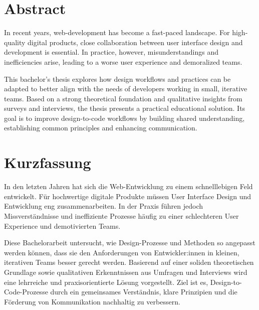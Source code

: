 \newpage
\section*{Abstract}
In recent years, web-development has become a fast-paced landscape. For high-quality digital
products, close collaboration between user interface design and development is essential. In
practice, however, misunderstandings and inefficiencies arise, leading to a worse user experience
and demoralized teams.

This bachelor's thesis explores how design workflows and practices can be adapted to better align
with the needs of developers working in small, iterative teams. Based on a strong theoretical
foundation and qualitative insights from surveys and interviews, the thesis presents a practical
educational solution. Its goal is to improve design-to-code workflows by building shared
understanding, establishing common principles and enhancing communication.

\section*{Kurzfassung}
In den letzten Jahren hat sich die Web-Entwicklung zu einem schnelllebigen Feld entwickelt. Für
hochwertige digitale Produkte müssen User Interface Design und Entwicklung eng zusammenarbeiten. In
der Praxis führen jedoch Missverständnisse und ineffiziente Prozesse häufig zu einer
schlechteren User Experience und demotivierten Teams.

Diese Bachelorarbeit untersucht, wie Design-Prozesse und Methoden so angepasst werden können, dass
sie den Anforderungen von Entwickler:innen in kleinen, iterativen Teams besser gerecht werden.
Basierend auf einer soliden theoretischen Grundlage sowie qualitativen Erkenntnissen aus Umfragen
und Interviews wird eine lehrreiche und praxisorientierte Lösung vorgestellt. Ziel ist es,
Design-to-Code-Prozesse durch ein gemeinsames Verständnis, klare Prinzipien und die Förderung von
Kommunikation nachhaltig zu verbessern.
